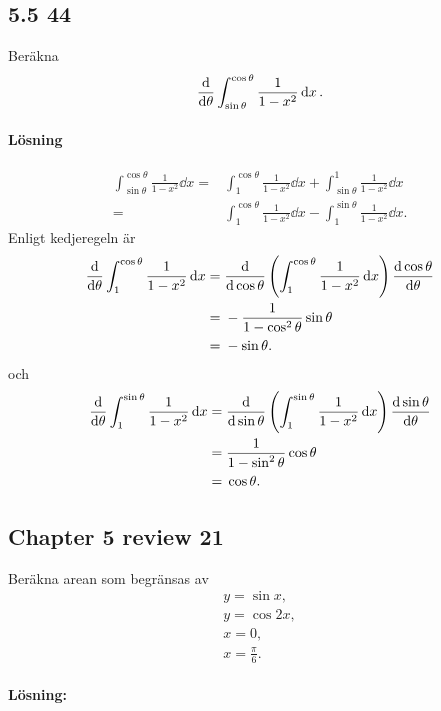 \subsection{5.5 44}%
\label{sub:5_5_44}

Beräkna
\begin{align*}
	\derivative{}{\theta} \int_{\sin \theta}^{\cos \theta} \frac{1}{1 - x^2} \dd{x}.
\end{align*}

\paragraph{Lösning}

\begin{align*}
	\int_{\sin \theta}^{\cos \theta} \frac{1}{1 - x^2} \dd{x} ={}&
	\int_{1}^{\cos \theta} \frac{1}{1 - x^2} \dd{x}
	+ \int_{\sin \theta}^{1} \frac{1}{1 - x^2} \dd{x}\\
	={}& \int_{1}^{\cos \theta} \frac{1}{1 - x^2} \dd{x}
	- \int_{1}^{\sin \theta} \frac{1}{1 - x^2} \dd{x}.
\end{align*}
Enligt kedjeregeln är
\begin{align*}
	\derivative{}{\theta} \int_{1}^{\cos \theta} \frac{1}{1 - x^2} \dd{x} ={}&
	\derivative{}{\cos \theta} \left(\int_{1}^{\cos \theta} \frac{1}{1 - x^2} \dd{x}\right) \derivative{\cos \theta}{\theta}\\
	={}& -\frac{1}{1 - \cos^2 \theta} \sin \theta\\
	={}& -\sin \theta.
\end{align*}
och
\begin{align*}
	\derivative{}{\theta} \int_{1}^{\sin \theta} \frac{1}{1 - x^2} \dd{x} ={}&
	\derivative{}{\sin \theta} \left(\int_{1}^{\sin \theta} \frac{1}{1 - x^2} \dd{x}\right) \derivative{\sin \theta}{\theta}\\
	={}& \frac{1}{1 - \sin^2 \theta} \cos \theta\\
	={}& \cos \theta.
\end{align*}


\subsection{Chapter 5 review 21}%
\label{sub:chapter_5_review_21}

Beräkna arean som begränsas av
\begin{align*}
	y = \sin x,\\
	y = \cos 2 x,\\
	x = 0,\\
	x = \frac{\pi}{6}.
\end{align*}

\paragraph{Lösning:}


